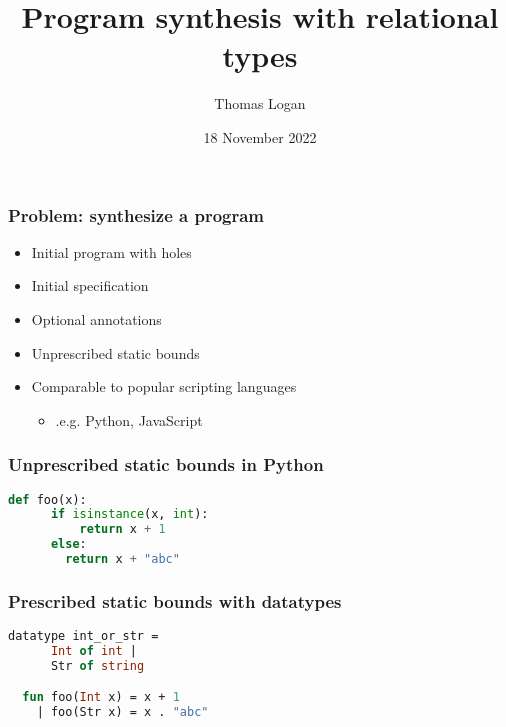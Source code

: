 \documentclass{beamer}
\title{Program synthesis with relational types}
\author{Thomas Logan}
\date{18 November 2022}
\begin{document}
\begin{frame}
  \titlepage
\end{frame}

\begin{frame}
  \frametitle{Problem: synthesize a program}

  \begin{itemize}
  \item Initial program with holes 
  \item Initial specification  
  \item Optional annotations  
  \item Unprescribed static bounds
  \item Comparable to popular scripting languages
    \begin{itemize}
    \item .e.g. Python, JavaScript  
    \end{itemize}
  \end{itemize}
\end{frame}

\begin{frame}[fragile]
  \frametitle{Unprescribed static bounds in Python}

  \begin{lstlisting}[language=Python]
  def foo(x):
      if isinstance(x, int):
          return x + 1 
      else:
        return x + "abc"
  \end{lstlisting}
\end{frame}

\begin{frame}[fragile]
  \frametitle{Prescribed static bounds with datatypes}

  \begin{lstlisting}[language=ML]
  datatype int_or_str = 
      Int of int | 
      Str of string

  fun foo(Int x) = x + 1
    | foo(Str x) = x . "abc"
  \end{lstlisting}

\end{frame}
\end{document}
